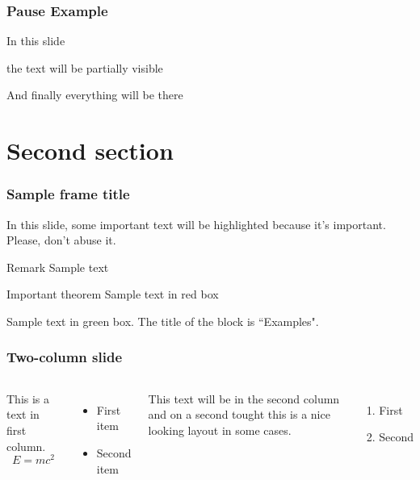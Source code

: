 \documentclass[aspectratio=169,t]{beamer}
\begin{document}

\begin{frame}
\frametitle{Pause Example}
In this slide \pause

the text will be partially visible \pause

And finally everything will be there
\end{frame}


\section{Second section}

\begin{frame}
\frametitle{Sample frame title}

In this slide, some important text will be
\alert{highlighted} because it's important.
Please, don't abuse it.

\begin{block}{Remark}
Sample text
\end{block}

\begin{alertblock}{Important theorem}
Sample text in red box
\end{alertblock}

\begin{examples}
Sample text in green box. The title of the block is ``Examples".
\end{examples}
\end{frame}


\blank
{}
\begin{frame}
\frametitle{Two-column slide}

\begin{columns}

This is a text in first column.
$$E=mc^2$$
\begin{itemize}
\item First item
\item Second item
\end{itemize}

This text will be in the second column
and on a second tought this is a nice looking
layout in some cases.
\begin{enumerate}
    \item First
    \item Second
\end{enumerate}
\end{columns}
\end{frame}
\end{document}
